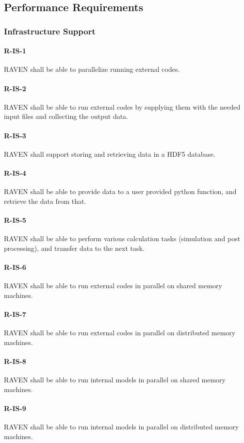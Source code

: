 \subsection{Performance Requirements}
\subsubsection{Infrastructure Support}
\paragraph{R-IS-1} 
RAVEN shall be able to parallelize running external codes.
\paragraph{R-IS-2} 
RAVEN shall be able to run external codes by supplying them with the needed input files and collecting the output data.
\paragraph{R-IS-3} 
RAVEN shall support storing and retrieving data in a HDF5 database.
\paragraph{R-IS-4} 
RAVEN shall be able to provide data to a user provided python function, and retrieve the data from that.
\paragraph{R-IS-5} 
RAVEN shall be able to perform various calculation tasks (simulation and post processing), and transfer data to the next task.
\paragraph{R-IS-6} 
RAVEN shall be able to run external codes in parallel on shared memory machines.
\paragraph{R-IS-7} 
RAVEN shall be able to run external codes in parallel on distributed memory machines.
\paragraph{R-IS-8} 
RAVEN shall be able to run internal models in parallel on shared memory machines.
\paragraph{R-IS-9} 
RAVEN shall be able to run internal models in parallel on distributed memory machines.
